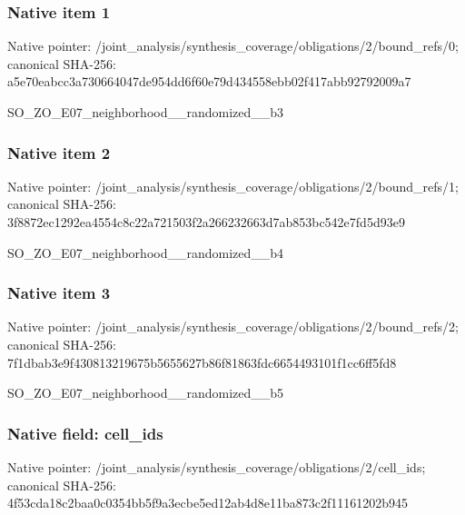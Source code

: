 \documentclass[10pt,a4paper]{article}
\begin{document}
\subsubsection{Native item 1}
Native pointer: /joint\_\allowbreak{}analysis/synthesis\_\allowbreak{}coverage/obligations/2/bound\_\allowbreak{}refs/0; canonical SHA-256: a5e70eabcc3a730664047de954dd6f60e79d434558ebb02f417abb92792009a7

\begingroup\raggedright\sloppy SO\_\allowbreak{}ZO\_\allowbreak{}E07\_\allowbreak{}neighborhood\_\allowbreak{}\_\allowbreak{}randomized\_\allowbreak{}\_\allowbreak{}b3\par\endgroup

\subsubsection{Native item 2}
Native pointer: /joint\_\allowbreak{}analysis/synthesis\_\allowbreak{}coverage/obligations/2/bound\_\allowbreak{}refs/1; canonical SHA-256: 3f8872ec1292ea4554c8c22a721503f2a266232663d7ab853bc542e7fd5d93e9

\begingroup\raggedright\sloppy SO\_\allowbreak{}ZO\_\allowbreak{}E07\_\allowbreak{}neighborhood\_\allowbreak{}\_\allowbreak{}randomized\_\allowbreak{}\_\allowbreak{}b4\par\endgroup

\subsubsection{Native item 3}
Native pointer: /joint\_\allowbreak{}analysis/synthesis\_\allowbreak{}coverage/obligations/2/bound\_\allowbreak{}refs/2; canonical SHA-256: 7f1dbab3e9f430813219675b5655627b86f81863fdc6654493101f1cc6ff5fd8

\begingroup\raggedright\sloppy SO\_\allowbreak{}ZO\_\allowbreak{}E07\_\allowbreak{}neighborhood\_\allowbreak{}\_\allowbreak{}randomized\_\allowbreak{}\_\allowbreak{}b5\par\endgroup

\subsubsection{Native field: cell\_\allowbreak{}ids}
Native pointer: /joint\_\allowbreak{}analysis/synthesis\_\allowbreak{}coverage/obligations/2/cell\_\allowbreak{}ids; canonical SHA-256: 4f53cda18c2baa0c0354bb5f9a3ecbe5ed12ab4d8e11ba873c2f11161202b945
\end{document}
